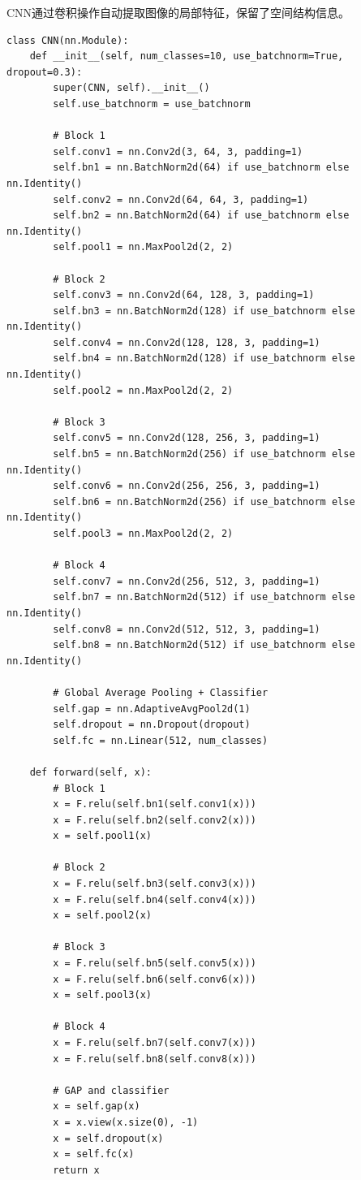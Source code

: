 \documentclass[12pt,a4paper]{article}
\begin{document}
CNN通过卷积操作自动提取图像的局部特征，保留了空间结构信息。

\begin{lstlisting}[caption={CNN模型定义},label={lst:cnn}]
class CNN(nn.Module):
    def __init__(self, num_classes=10, use_batchnorm=True, dropout=0.3):
        super(CNN, self).__init__()
        self.use_batchnorm = use_batchnorm
        
        # Block 1
        self.conv1 = nn.Conv2d(3, 64, 3, padding=1)
        self.bn1 = nn.BatchNorm2d(64) if use_batchnorm else nn.Identity()
        self.conv2 = nn.Conv2d(64, 64, 3, padding=1)
        self.bn2 = nn.BatchNorm2d(64) if use_batchnorm else nn.Identity()
        self.pool1 = nn.MaxPool2d(2, 2)
        
        # Block 2
        self.conv3 = nn.Conv2d(64, 128, 3, padding=1)
        self.bn3 = nn.BatchNorm2d(128) if use_batchnorm else nn.Identity()
        self.conv4 = nn.Conv2d(128, 128, 3, padding=1)
        self.bn4 = nn.BatchNorm2d(128) if use_batchnorm else nn.Identity()
        self.pool2 = nn.MaxPool2d(2, 2)
        
        # Block 3
        self.conv5 = nn.Conv2d(128, 256, 3, padding=1)
        self.bn5 = nn.BatchNorm2d(256) if use_batchnorm else nn.Identity()
        self.conv6 = nn.Conv2d(256, 256, 3, padding=1)
        self.bn6 = nn.BatchNorm2d(256) if use_batchnorm else nn.Identity()
        self.pool3 = nn.MaxPool2d(2, 2)
        
        # Block 4
        self.conv7 = nn.Conv2d(256, 512, 3, padding=1)
        self.bn7 = nn.BatchNorm2d(512) if use_batchnorm else nn.Identity()
        self.conv8 = nn.Conv2d(512, 512, 3, padding=1)
        self.bn8 = nn.BatchNorm2d(512) if use_batchnorm else nn.Identity()
        
        # Global Average Pooling + Classifier
        self.gap = nn.AdaptiveAvgPool2d(1)
        self.dropout = nn.Dropout(dropout)
        self.fc = nn.Linear(512, num_classes)
        
    def forward(self, x):
        # Block 1
        x = F.relu(self.bn1(self.conv1(x)))
        x = F.relu(self.bn2(self.conv2(x)))
        x = self.pool1(x)
        
        # Block 2
        x = F.relu(self.bn3(self.conv3(x)))
        x = F.relu(self.bn4(self.conv4(x)))
        x = self.pool2(x)
        
        # Block 3
        x = F.relu(self.bn5(self.conv5(x)))
        x = F.relu(self.bn6(self.conv6(x)))
        x = self.pool3(x)
        
        # Block 4
        x = F.relu(self.bn7(self.conv7(x)))
        x = F.relu(self.bn8(self.conv8(x)))
        
        # GAP and classifier
        x = self.gap(x)
        x = x.view(x.size(0), -1)
        x = self.dropout(x)
        x = self.fc(x)
        return x
\end{lstlisting}
\end{document}
